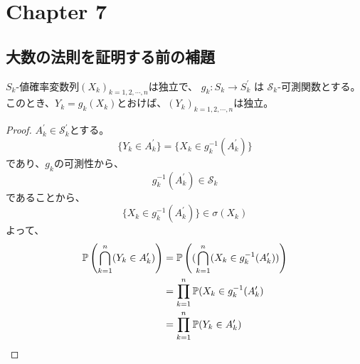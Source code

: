   \section{Chapter 7}
    \subsection{大数の法則を証明する前の補題}
      \begin{prop*}
        $S_k$-値確率変数列$(X_k)_{k = 1,2,\cdots, n}$は独立で、
        $g_k \colon S_k \to S_k^{\prime}$
        は
        $\mathcal{S}_k$-可測関数とする。
        このとき、$Y_k = g_k(X_k)$とおけば、$(Y_k)_{k=1,2,\cdots,n}$は独立。
      \end{prop*}
      \begin{proof}
        $A_k^{\prime} \in \mathcal{S}_k^{\prime}$とする。
        \[
          \{Y_k \in A_k^{\prime}\} = \{X_k \in g_k^{-1}(A_k^{\prime})\}
        \]
        であり、$g_k$の可測性から、
        \[
          g_k^{-1}(A_k^{\prime}) \in \mathcal{S}_k
        \]
        であることから、
        \[
          \{X_k \in g_k^{-1}(A_k^{\prime})\} \in \sigma(X_k)
        \]
        よって、
        \begin{align*}
          {\mathbb{P}} \left(\bigcap_{k=1}^{n} (Y_k \in A_k^{\prime})\right) &= {\mathbb{P}} \left((\bigcap_{k=1}^{n} (X_k \in g_k^{-1}(A_k^{\prime}))\right) \\
          &= \prod_{k=1}^n {\mathbb{P}}(X_k \in g_k^{-1}(A_k^{\prime}) \\
          &= \prod_{k=1}^n {\mathbb{P}}(Y_k \in A_k^{\prime})
        \end{align*}
      \end{proof}

